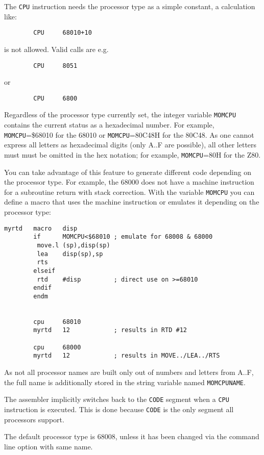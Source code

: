 \documentclass[12pt,twoside]{report}
\newcommand{\tty}[1]{{\tt #1}}
\begin{document}
The \tty{CPU} instruction needs the processor type as a simple constant, a
calculation like:
\begin{verbatim}
        CPU     68010+10
\end{verbatim}
is not allowed.  Valid calls are e.g.
\begin{verbatim}
        CPU     8051
\end{verbatim}
or
\begin{verbatim}
        CPU     6800
\end{verbatim}
Regardless of the processor type currently set, the integer variable
\tty{MOMCPU} contains the current status as a hexadecimal number.  For
example, \tty{MOMCPU}=\$68010 for the 68010 or \tty{MOMCPU}=80C48H for the
80C48.  As one cannot express all letters as hexadecimal digits (only A..F
are possible), all other letters must must be omitted in the hex notation;
for example, \tty{MOMCPU}=80H for the Z80.

You can take advantage of this feature to generate different code
depending on the processor type.  For example, the 68000 does not have a
machine instruction for a subroutine return with stack correction.  With
the variable \tty{MOMCPU} you can define a macro that uses the machine
instruction or emulates it depending on the processor type:
\begin{verbatim}
myrtd   macro   disp
        if      MOMCPU<$68010 ; emulate for 68008 & 68000 
         move.l (sp),disp(sp)   
         lea    disp(sp),sp     
         rts                    
        elseif                  
         rtd    #disp         ; direct use on >=68010 
        endif
        endm


        cpu     68010
        myrtd   12            ; results in RTD #12

        cpu     68000
        myrtd   12            ; results in MOVE../LEA../RTS
\end{verbatim}
As not all processor names are built only out of numbers and letters
from A..F, the full name is additionally stored in the string
variable named \tty{MOMCPUNAME}.

The assembler implicitly switches back to the \tty{CODE} segment when a
\tty{CPU} instruction is executed.  This is done because \tty{CODE} is the
only segment all processors support.

The default processor type is 68008, unless it has been changed via the
command line option with same name.

\end{document}
